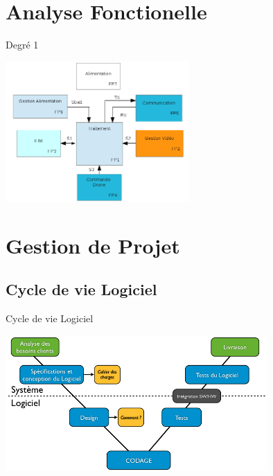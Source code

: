 \documentclass[11pt]{beamer}
\begin{document}
	
	\section{Analyse Fonctionelle}
	\begin{frame}{Degré 1}
	\begin{center}
		\includegraphics[width=7cm]{common/fonc.png}
	\end{center}
	\end{frame}
	
	
	\section{Gestion de Projet}
	\subsection{Cycle de vie Logiciel}
	\begin{frame}{Cycle de vie Logiciel}
		\begin{center}
			\includegraphics[width=10cm]{common/V.png}
		\end{center}
	\end{frame}
	
\end{document}
